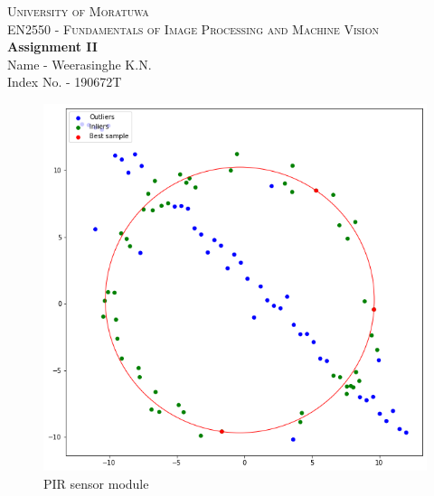 \documentclass[a4paper, 12pt]{article}
\begin{document}
\centering
\colorbox{white!10!}{
    \begin{minipage}[H]{\textwidth}
        \begin{center}
            {\large \textsc{University of Moratuwa}}\\
            {\large \textsc{EN2550 - Fundamentals of Image Processing and Machine Vision}}
            \vspace{0.25cm}
            \\
            { \huge \textbf{Assignment II}}
            \\
            \vspace{0.25cm}
            \small Name - Weerasinghe K.N.\\
            \small Index No. - 190672T
        \end{center}
    \end{minipage}
}
\begin{center}
\end{center}

\begin{figure}
    \centering
    \includegraphics[width=4 cm]{Images/Q1 - RANSAC.png}
    \caption{\centering PIR sensor module}
    \label{fig:im1}
\end{figure}
\end{document}
